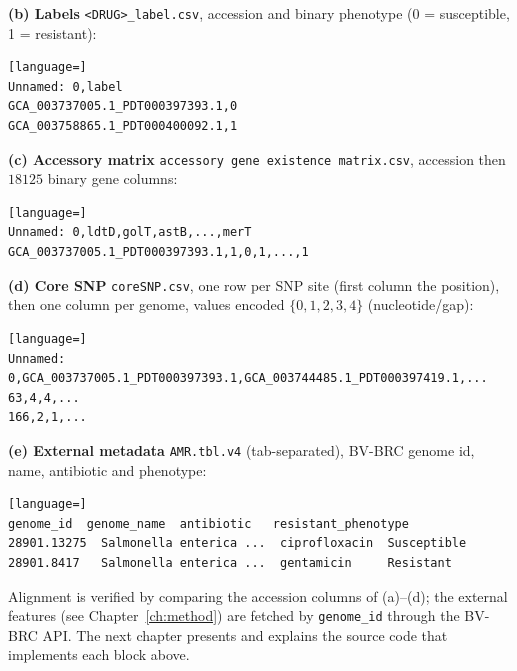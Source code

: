 \documentclass[../main.tex]{subfiles}
\begin{document}
\textbf{(b) Labels} \texttt{<DRUG>\_label.csv}, accession and binary phenotype (0 = susceptible, 1 = resistant):
\begin{lstlisting}[language=]
Unnamed: 0,label
GCA_003737005.1_PDT000397393.1,0
GCA_003758865.1_PDT000400092.1,1
\end{lstlisting}

\textbf{(c) Accessory matrix} \texttt{accessory gene existence matrix.csv}, accession then $18125$ binary gene columns:
\begin{lstlisting}[language=]
Unnamed: 0,ldtD,golT,astB,...,merT
GCA_003737005.1_PDT000397393.1,1,0,1,...,1
\end{lstlisting}

\textbf{(d) Core SNP} \texttt{coreSNP.csv}, one row per SNP site (first column the position), then one column per genome, values encoded $\{0,1,2,3,4\}$ (nucleotide/gap):
\begin{lstlisting}[language=]
Unnamed: 0,GCA_003737005.1_PDT000397393.1,GCA_003744485.1_PDT000397419.1,...
63,4,4,...
166,2,1,...
\end{lstlisting}

\textbf{(e) External metadata} \texttt{AMR.tbl.v4} (tab-separated), BV-BRC genome id, name, antibiotic and phenotype:
\begin{lstlisting}[language=]
genome_id  genome_name  antibiotic   resistant_phenotype
28901.13275  Salmonella enterica ...  ciprofloxacin  Susceptible
28901.8417   Salmonella enterica ...  gentamicin     Resistant
\end{lstlisting}

Alignment is verified by comparing the accession columns of (a)--(d); the external features (see Chapter~\ref{ch:method}) are fetched by \texttt{genome\_id} through the BV-BRC API. The next chapter presents and explains the source code that implements each block above.
\end{document}
